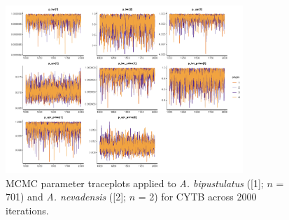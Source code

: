 \documentclass[12pt]{article}
\begin{document}
\begin{figure}[H]

\centering

\includegraphics[width=0.80\textwidth]{Figure 2}

\caption{MCMC parameter traceplots applied to \textit{A. bipustulatus} ([1]; $n$ = 701) and \textit{A. nevadensis} ([2]; $n$ = 2) for CYTB across 2000 iterations.}

\end{figure}
\end{document}

